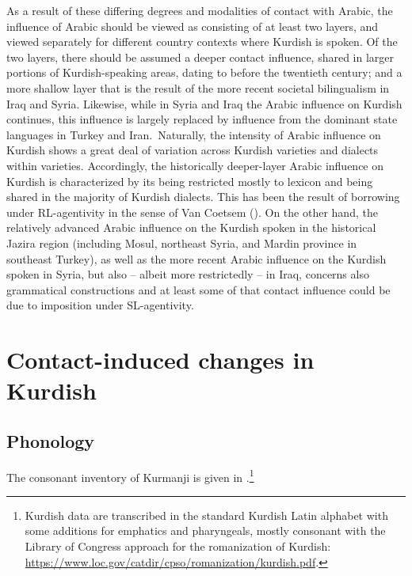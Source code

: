 \documentclass[output=paper]{langsci/langscibook}
\begin{document}
As a result of these differing degrees and modalities of contact with Arabic, the influence of Arabic should be viewed as consisting of at least two layers, and viewed separately for different country contexts where Kurdish is spoken. Of the two layers, there should be assumed a deeper contact influence, shared in larger portions of Kurdish-speaking areas, dating to before the twentieth century; and a more shallow layer that is the result of the more recent societal bilingualism in Iraq and Syria. Likewise, while in Syria and Iraq the Arabic influence on Kurdish continues, this influence is largely replaced by influence from the dominant state languages in Turkey and Iran.~Naturally, the intensity of Arabic influence on Kurdish shows a great deal of variation across Kurdish varieties and dialects within varieties. Accordingly, the historically deeper-layer Arabic influence on Kurdish is characterized by its being restricted mostly to lexicon and being shared in the majority of Kurdish dialects. This has been the result of borrowing under RL-agentivity in the sense of Van Coetsem (\citeyear{VanCoetsem1988,VanCoetsem2000}). On the other hand, the relatively advanced Arabic influence on the Kurdish spoken in the historical Jazira region (including Mosul, northeast Syria, and Mardin province in southeast Turkey), as well as the more recent Arabic influence on the Kurdish spoken in Syria, but also – albeit more restrictedly – in Iraq, concerns also grammatical constructions and at least some of that contact influence could be due to imposition under SL-agentivity.    

\section{Contact-induced changes in Kurdish} 

\subsection{\label{bkm:Ref14688184}Phonology}

The consonant inventory of Kurmanji is given in .\footnote{Kurdish data are transcribed in the standard Kurdish Latin alphabet with some additions for emphatics and pharyngeals, mostly consonant with the Library of Congress approach for the romanization of Kurdish: \url{https://www.loc.gov/catdir/cpso/romanization/kurdish.pdf}.} 
\end{document}
